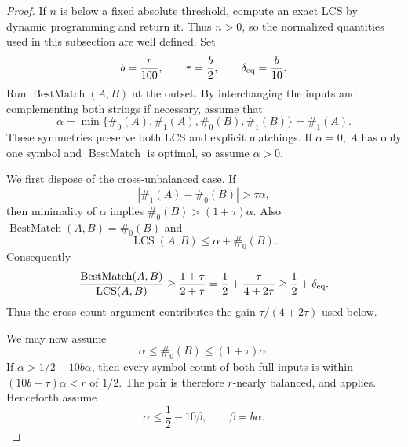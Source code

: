 \documentclass[11pt]{article}
\theoremstyle{remark}
\newcommand{\LCS}{\operatorname{LCS}}
\newcommand{\BestMatch}{\operatorname{BestMatch}}
\begin{document}
\begin{proof}
If $n$ is below a fixed absolute threshold, compute an exact LCS by dynamic
programming and return it.  Thus $n>0$, so the normalized quantities used in
this subsection are well defined.
Set
\begin{equation}\label{eq:RS-parameters}
 b=\frac r{100},\qquad \tau=\frac b2,
 \qquad \delta_{\rm eq}=\frac b{10}.
\end{equation}
Run $\BestMatch(A,B)$ at the outset.  By interchanging the inputs and
complementing both strings if necessary, assume that
\[
 \alpha=\min\{\#_0(A),\#_1(A),\#_0(B),\#_1(B)\}
 =\#_1(A).
\]
These symmetries preserve both LCS and explicit matchings.  If
$\alpha=0$, $A$ has only one symbol and $\BestMatch$ is optimal, so
assume $\alpha>0$.

We first dispose of the cross-unbalanced case.  If
\begin{equation}\label{eq:cross-unbalanced}
 |\#_1(A)-\#_0(B)|>\tau\alpha,
\end{equation}
then minimality of $\alpha$ implies
$\#_0(B)>(1+\tau)\alpha$.  Also
$\BestMatch(A,B)=\#_0(B)$ and
\[
 \LCS(A,B)\le\alpha+\#_0(B).
\]
Consequently
\begin{equation}\label{eq:cross-ratio}
 \frac{\BestMatch(A,B)}{\LCS(A,B)}
 \ge\frac{1+\tau}{2+\tau}
 =\frac12+\frac{\tau}{4+2\tau}
 \ge\frac12+\delta_{\rm eq}.
\end{equation}
Thus the cross-count argument contributes the gain
$\tau/(4+2\tau)$ used below.

We may now assume
\begin{equation}\label{eq:cross-close}
 \alpha\le\#_0(B)\le(1+\tau)\alpha.
\end{equation}
If $\alpha>1/2-10b\alpha$, then every symbol count of both full
inputs is within
$(10b+\tau)\alpha<r$ of $1/2$.  The pair is therefore $r$-nearly
balanced, and  applies.  Henceforth assume
\begin{equation}\label{eq:alpha-away-half}
 \alpha\le\frac12-10\beta,
 \qquad \beta=b\alpha.
\end{equation}


\end{proof}
\end{document}
